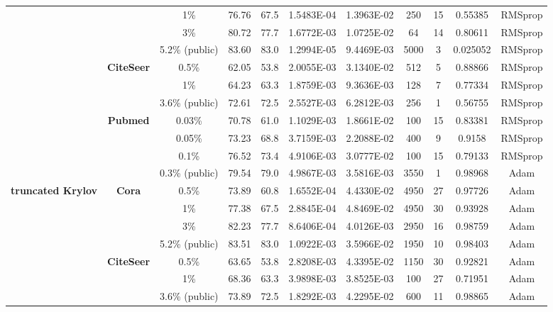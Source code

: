 \documentclass{article}
\begin{document}
\begin{table}[htbp]
\begin{tabular}{ccccc|cccccc}
          &       & 1\%   & 76.76 & 67.5  & 1.5483E-04 & 1.3963E-02 & 250   & 15    & 0.55385 & RMSprop \\
          &       & 3\%   & 80.72 & 77.7  & 1.6772E-03 & 1.0725E-02 & 64    & 14    & 0.80611 & RMSprop \\
          &       & 5.2\% (public) & 83.60 & 83.0  & 1.2994E-05 & 9.4469E-03 & 5000  & 3     & 0.025052 & RMSprop \\
          & \multirow{3}[0]{*}{\textbf{CiteSeer}} & 0.5\% & 62.05 & 53.8  & 2.0055E-03 & 3.1340E-02 & 512   & 5     & 0.88866 & RMSprop \\
          &       & 1\%   & 64.23 & 63.3  & 1.8759E-03 & 9.3636E-03 & 128   & 7     & 0.77334 & RMSprop \\
          &       & 3.6\% (public) & 72.61 & 72.5  & 2.5527E-03 & 6.2812E-03 & 256   & 1     & 0.56755 & RMSprop \\
          & \multirow{4}[1]{*}{\textbf{Pubmed}} & 0.03\% & 70.78 & 61.0  & 1.1029E-03 & 1.8661E-02 & 100   & 15    & 0.83381 & RMSprop \\
          &       & 0.05\% & 73.23 & 68.8  & 3.7159E-03 & 2.2088E-02 & 400   & 9     & 0.9158 & RMSprop \\
          &       & 0.1\% & 76.52 & 73.4  & 4.9106E-03 & 3.0777E-02 & 100   & 15    & 0.79133 & RMSprop \\
          &       & 0.3\% (public) & 79.54 & 79.0  & 4.9867E-03 & 3.5816E-03 & 3550  & 1     & 0.98968 & Adam \\
    \midrule
    \multirow{11}[2]{*}{\textbf{truncated Krylov}} & \multirow{4}[1]{*}{\textbf{Cora}} & 0.5\% & 73.89 & 60.8  & 1.6552E-04 & 4.4330E-02 & 4950  & 27    & 0.97726 & Adam \\
          &       & 1\%   & 77.38 & 67.5  & 2.8845E-04 & 4.8469E-02 & 4950  & 30    & 0.93928 & Adam \\
          &       & 3\%   & 82.23 & 77.7  & 8.6406E-04 & 4.0126E-03 & 2950  & 16    & 0.98759 & Adam \\
          &       & 5.2\% (public) & 83.51 & 83.0  & 1.0922E-03 & 3.5966E-02 & 1950  & 10    & 0.98403 & Adam \\
          & \multirow{3}[0]{*}{\textbf{CiteSeer}} & 0.5\% & 63.65 & 53.8  & 2.8208E-03 & 4.3395E-02 & 1150  & 30    & 0.92821 & Adam \\
          &       & 1\%   & 68.36 & 63.3  & 3.9898E-03 & 3.8525E-03 & 100   & 27    & 0.71951 & Adam \\
          &       & 3.6\% (public) & 73.89 & 72.5  & 1.8292E-03 & 4.2295E-02 & 600   & 11    & 0.98865 & Adam \\

\end{tabular}
\end{table}
\end{document}
